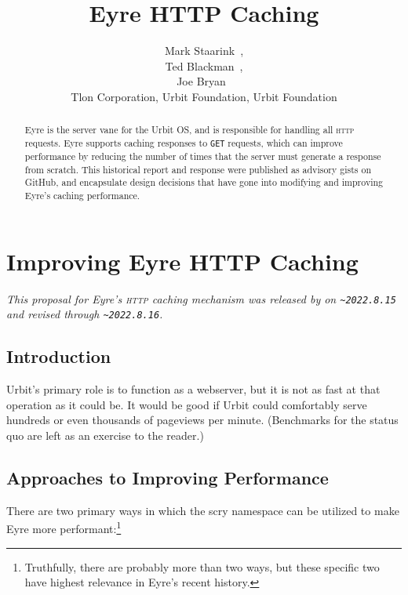 \documentclass[twoside]{article}
\title{Eyre HTTP Caching}
\author{Mark Staarink~\patp{palfun-foslup}, \\ Ted Blackman~\patp{rovyns-ricfer}, \\ Joe Bryan~\patp{master-morzod} \\ Tlon Corporation, Urbit Foundation, Urbit Foundation}
\date{}
\begin{document}
\maketitle
\thispagestyle{firststyle}

\begin{abstract}
  Eyre is the server vane for the Urbit OS, and is responsible for handling all \textsc{http} requests.  Eyre supports caching responses to \texttt{GET} requests, which can improve performance by reducing the number of times that the server must generate a response from scratch.  This historical report and response were published as advisory gists on GitHub, and encapsulate design decisions that have gone into modifying and improving Eyre's caching performance.
\end{abstract}

\setcounter{page}{1}

\tableofcontents

\section[Improving Eyre \textsc{http} Caching]{Improving Eyre HTTP Caching}

\noindent\sloppy
\emph{This proposal for Eyre's \textsc{http} caching mechanism was released by  on \texttt{\textasciitilde 2022.8.15} and revised through \texttt{\textasciitilde 2022.8.16}.}

\subsection{Introduction}

Urbit's primary role is to function as a webserver, but it is not as fast at that operation as it could be.  It would be good if Urbit could comfortably serve hundreds or even thousands of pageviews per minute.  (Benchmarks for the status quo are left as an exercise to the reader.)

\subsection{Approaches to Improving Performance}

There are two primary ways in which the scry namespace can be utilized to make Eyre more performant:\footnote{Truthfully, there are probably more than two ways, but these specific two have highest relevance in Eyre's recent history.}
\end{document}
